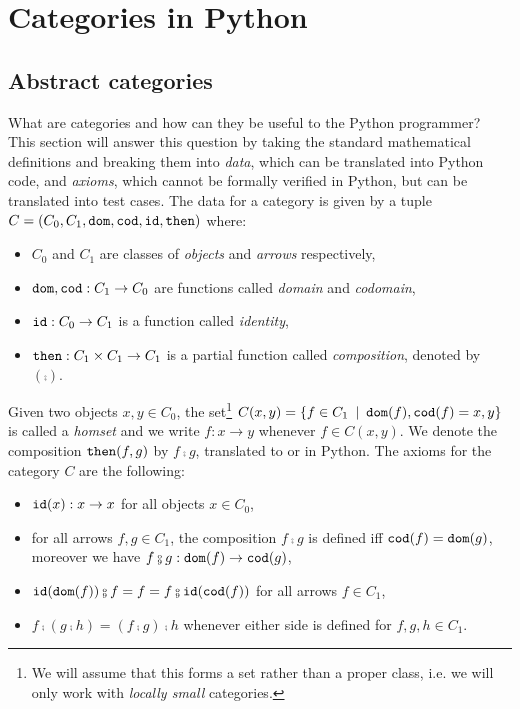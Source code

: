 
\section{Categories in Python} \label{section:cat}

\subsection{Abstract categories}

What are categories and how can they be useful to the Python programmer?
This section will answer this question by taking the standard mathematical definitions and breaking them into \emph{data}, which can be translated into Python code, and \emph{axioms}, which cannot be formally verified in Python, but can be translated into test cases.
The data for a category is given by a tuple $C = (C_0, C_1, \mathtt{dom}, \mathtt{cod}, \mathtt{id}, \mathtt{then})$ where:
\begin{itemize}
\item $C_0$ and $C_1$ are classes of \emph{objects} and \emph{arrows} respectively,
\item $\mathtt{dom}, \mathtt{cod} : C_1 \to C_0$ are functions called \emph{domain} and \emph{codomain},
\item $\mathtt{id} : C_0 \to C_1$ is a function called \emph{identity},
\item $\mathtt{then} : C_1 \times C_1 \to C_1$ is a partial function called \emph{composition}, denoted by $(\fcmp)$.
\end{itemize}
Given two objects $x, y \in C_0$, the set\footnote
{We will assume that this forms a set rather than a proper class, i.e. we will only work with \emph{locally small} categories.}
$C(x, y) = \{f \in C_1 \enspace \vert \enspace \mathtt{dom}(f), \mathtt{cod}(f) = x, y \}$ is called a \emph{homset} and we write $f : x \to y$ whenever $f \in C(x, y)$.
We denote the composition $\mathtt{then}(f, g)$ by $f \fcmp g$, translated to  or  in Python.
The axioms for the category $C$ are the following:
\begin{itemize}
\item $\mathtt{id}(x) : x \to x$ for all objects $x \in C_0$,
\item for all arrows $f, g \in C_1$, the composition $f \fcmp g$ is defined iff $\mathtt{cod}(f) = \mathtt{dom}(g)$, moreover we have $f \fcmp g : \dom(f) \to \cod(g)$,
\item $\id(\dom(f)) \fcmp f = f = f \fcmp \id(\cod(f))$ for all arrows $f \in C_1$,
\item $f \fcmp (g \fcmp h) = (f \fcmp g) \fcmp h$ whenever either side is defined for $f, g, h \in C_1$.
\end{itemize}

